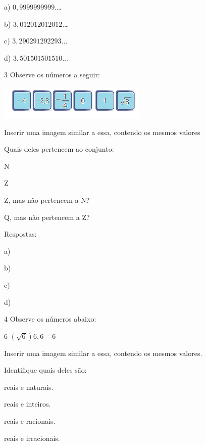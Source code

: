 a) $0,9999999999$.\ldots{}

b) $3,012012012012$.\ldots{}

c) $3,290291292293$... 

d) $3,501501501510$...



\num{3} Observe os números a seguir:

\includegraphics[width=2.79167in,height=0.63542in]{./imgSAEB_8_MAT/media/image1.png}

Inserir uma imagem similar a essa, contendo os mesmos valores

Quais deles pertencem ao conjunto:

\begin{escolha}

\item N
\item Z
\item Z, mas não pertencem a N?
\item Q, mas não pertencem a Z?
\end{escolha}

Respostas:

a) 

b) 

c) 

d) 

\num{4} Observe os números abaixo:

6 $(\sqrt{6}) 6,6 -6$

Inserir uma imagem similar a essa, contendo os mesmos valores.

Identifique quais deles são:

\begin{escolha}
\item reais e naturais.
\item reais e inteiros.
\item reais e racionais.
\item reais e irracionais.
\end{escolha}

